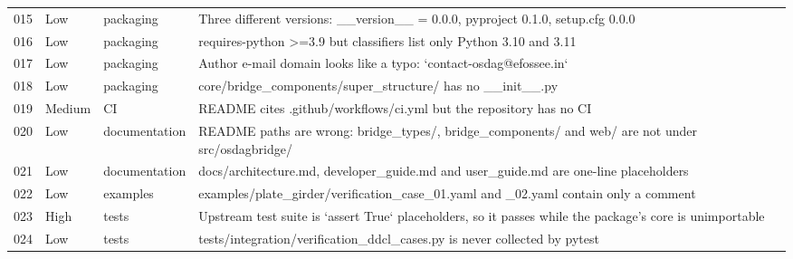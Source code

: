 \begin{longtable}{@{}p{0.9cm}p{1.5cm}p{2.6cm}p{8.2cm}@{}}
015 & Low & packaging & Three different versions: \_\allowbreak{}\_\allowbreak{}version\_\allowbreak{}\_\allowbreak{} = 0.\allowbreak{}0.\allowbreak{}0, pyproject 0.\allowbreak{}1.\allowbreak{}0, setup.\allowbreak{}cfg 0.\allowbreak{}0.\allowbreak{}0 \\
016 & Low & packaging & requires-python >=3.\allowbreak{}9 but classifiers list only Python 3.\allowbreak{}10 and 3.\allowbreak{}11 \\
017 & Low & packaging & Author e-mail domain looks like a typo: `contact-osdag@efossee.\allowbreak{}in` \\
018 & Low & packaging & core/\allowbreak{}bridge\_\allowbreak{}components/\allowbreak{}super\_\allowbreak{}structure/\allowbreak{} has no \_\allowbreak{}\_\allowbreak{}init\_\allowbreak{}\_\allowbreak{}.\allowbreak{}py \\
019 & Medium & CI & README cites .\allowbreak{}github/\allowbreak{}workflows/\allowbreak{}ci.\allowbreak{}yml but the repository has no CI \\
020 & Low & documentation & README paths are wrong: bridge\_\allowbreak{}types/\allowbreak{}, bridge\_\allowbreak{}components/\allowbreak{} and web/\allowbreak{} are not under src/\allowbreak{}osdagbridge/\allowbreak{} \\
021 & Low & documentation & docs/\allowbreak{}architecture.\allowbreak{}md, developer\_\allowbreak{}guide.\allowbreak{}md and user\_\allowbreak{}guide.\allowbreak{}md are one-line placeholders \\
022 & Low & examples & examples/\allowbreak{}plate\_\allowbreak{}girder/\allowbreak{}verification\_\allowbreak{}case\_\allowbreak{}01.\allowbreak{}yaml and \_\allowbreak{}02.\allowbreak{}yaml contain only a comment \\
023 & High & tests & Upstream test suite is `assert True` placeholders, so it passes while the package's core is unimportable \\
024 & Low & tests & tests/\allowbreak{}integration/\allowbreak{}verification\_\allowbreak{}ddcl\_\allowbreak{}cases.\allowbreak{}py is never collected by pytest \\
\bottomrule
\end{longtable}
